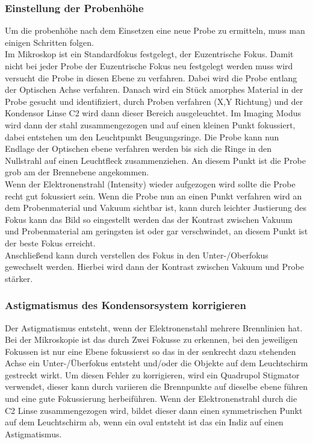 \subsubsection{Einstellung der Probenhöhe}
Um die probenhöhe nach dem Einsetzen eine neue Probe zu ermitteln, muss man einigen Schritten folgen.\\
Im Mikroskop ist ein Standardfokus festgelegt, der Euzentrische Fokus. Damit nicht bei jeder Probe der Euzentrische Fokus neu festgelegt werden muss wird versucht die Probe in diesen Ebene zu verfahren. Dabei wird die Probe entlang der Optischen Achse verfahren. Danach wird ein Stück amorphes Material in der Probe gesucht und identifiziert, durch Proben verfahren (X,Y Richtung) und der Kondensor Linse C2 wird dann dieser Bereich ausgeleuchtet. Im Imaging Modus wird dann der stahl zusammengezogen und auf einen kleinen Punkt fokussiert, dabei entstehen um den Leuchtpunkt Beugungsringe. Die Probe kann nun Endlage der Optischen ebene verfahren werden bis sich die Ringe in den Nullstrahl auf einen Leuchtfleck zusammenziehen.  An diesem Punkt ist die Probe grob am der Brennebene angekommen.\\
Wenn der Elektronenstrahl (Intensity) wieder aufgezogen wird sollte die Probe recht gut fokussiert sein. Wenn die Probe nun an einen Punkt verfahren wird an dem Probenmaterial und Vakuum sichtbar ist, kann durch leichter Justierung des Fokus kann das Bild so eingestellt werden das der Kontrast zwischen Vakuum und Probenmaterial am geringsten ist oder gar verschwindet, an diesem Punkt ist der beste Fokus erreicht. \\
Anschließend kann durch verstellen des Fokus in den Unter-/Oberfokus gewechselt werden. Hierbei wird dann der Kontrast zwischen Vakuum und Probe stärker.

\subsubsection{Astigmatismus des Kondensorsystem korrigieren}
Der Astigmatismus entsteht, wenn der Elektronenstahl mehrere Brennlinien hat. Bei der Mikroskopie ist das durch Zwei Fokusse zu erkennen, bei den jeweiligen Fokussen ist nur eine Ebene fokussierst so das in der senkrecht dazu stehenden Achse ein Unter-/Überfokus entsteht und/oder die Objekte auf dem Leuchtschirm gestreckt wirkt. Um diesen Fehler zu korrigieren, wird ein Quadrupol Stigmator verwendet, dieser kann durch variieren die Brennpunkte auf dieselbe ebene führen und eine gute Fokussierung herbeiführen. Wenn der Elektronenstrahl durch die C2 Linse zusammengezogen wird, bildet dieser dann einen symmetrischen Punkt auf dem Leuchtschirm ab, wenn ein oval entsteht ist das ein Indiz auf einen Astigmatismus.

